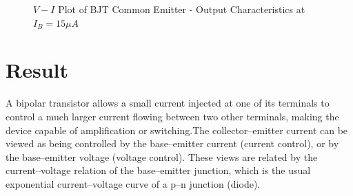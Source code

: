			\begin{figure}[h]
				\centering
				\caption{$V - I$ Plot of BJT Common Emitter - Output Characteristics at $I_B = 15 \mu A$}
			\end{figure}
		
	\section{Result}
		A bipolar transistor allows a small current injected at one of its terminals to control a much larger current flowing between two other terminals, making the device capable of amplification or switching.The collector–emitter current can be viewed as being controlled by the base–emitter current (current control), or by the base–emitter voltage (voltage control). These views are related by the current–voltage relation of the base–emitter junction, which is the usual exponential current–voltage curve of a p–n junction (diode).